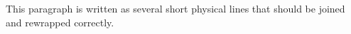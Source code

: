 This paragraph is written as several
short physical lines that should be
joined and rewrapped correctly.
